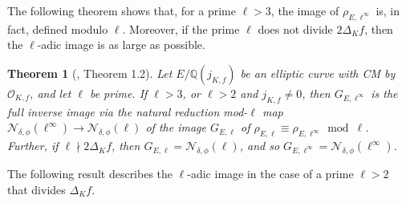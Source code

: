 \documentclass[11pt]{amsart}
\newtheorem{thm}[defn]{Theorem}
\theoremstyle{definition}
\newcommand{\Q}{\mathbb{Q}}
\newcommand{\Z}{\mathbb{Z}}
\newcommand{\OO}{\mathcal{O}}
\newcommand{\GL}{\operatorname{GL}}
\begin{document}
The following theorem shows that, for a prime $\ell>3$, the image of $\rho_{E,\ell^\infty}$ is, in fact, defined modulo $\ell$. Moreover, if the prime $\ell$ does not divide $2\Delta_K f$, then the $\ell$-adic image is as large as possible.

\begin{thm}[\cite{lozano-galoiscm}, Theorem 1.2]\label{thm-goodredn}
Let $E/\Q(j_{K,f})$ be an elliptic curve with CM by $\OO_{K,f}$, and let $\ell$ be prime. If $\ell > 3$, or $\ell > 2$ and $j_{K,f} \neq 0$, then $G_{E,\ell^\infty}$ is the full inverse image via the natural reduction mod-$\ell$ map $\mathcal{N}_{\delta,\phi}(\ell^\infty)\to \mathcal{N}_{\delta,\phi}(\ell)$ of the image $G_{E,\ell}$ of $\rho_{E,\ell}\equiv \rho_{E,\ell^\infty}\bmod \ell$. Further, if $\ell \nmid 2 \Delta_K f$, then $G_{E,\ell} = \mathcal{N}_{\delta, \phi}(\ell)$, and so $G_{E,\ell^{\infty}} = \mathcal{N}_{\delta, \phi}(\ell^{\infty})$.
\end{thm}


 
The following result describes the $\ell$-adic image in the case of a prime $\ell>2$ that divides $\Delta_K f$.
\end{document}
